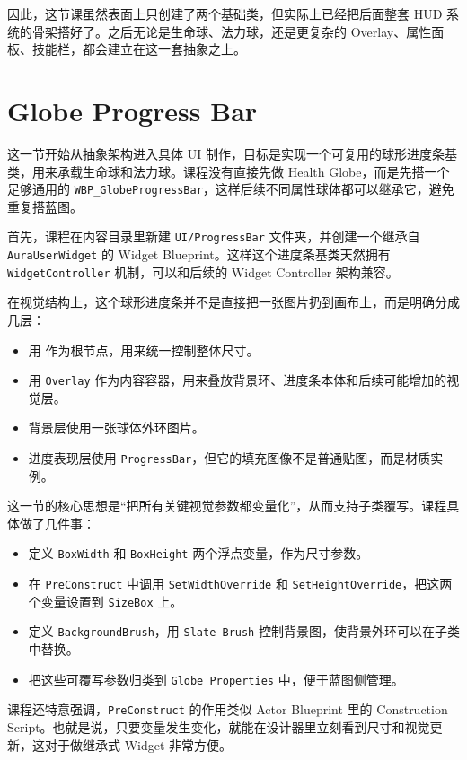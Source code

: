 因此，这节课虽然表面上只创建了两个基础类，但实际上已经把后面整套 HUD 系统的骨架搭好了。之后无论是生命球、法力球，还是更复杂的 Overlay、属性面板、技能栏，都会建立在这一套抽象之上。

\section{Globe Progress Bar}

这一节开始从抽象架构进入具体 UI 制作，目标是实现一个可复用的球形进度条基类，用来承载生命球和法力球。课程没有直接先做 Health Globe，而是先搭一个足够通用的 \texttt{WBP\_GlobeProgressBar}，这样后续不同属性球体都可以继承它，避免重复搭蓝图。

首先，课程在内容目录里新建 \texttt{UI/ProgressBar} 文件夹，并创建一个继承自 \texttt{AuraUserWidget} 的 Widget Blueprint。这样这个进度条基类天然拥有 \texttt{WidgetController} 机制，可以和后续的 Widget Controller 架构兼容。

在视觉结构上，这个球形进度条并不是直接把一张图片扔到画布上，而是明确分成几层：
\begin{itemize}
	\item 用  作为根节点，用来统一控制整体尺寸。
	\item 用 \texttt{Overlay} 作为内容容器，用来叠放背景环、进度条本体和后续可能增加的视觉层。
	\item 背景层使用一张球体外环图片。
	\item 进度表现层使用 \texttt{ProgressBar}，但它的填充图像不是普通贴图，而是材质实例。
\end{itemize}

这一节的核心思想是“把所有关键视觉参数都变量化”，从而支持子类覆写。课程具体做了几件事：
\begin{itemize}
	\item 定义 \texttt{BoxWidth} 和 \texttt{BoxHeight} 两个浮点变量，作为尺寸参数。
	\item 在 \texttt{PreConstruct} 中调用 \texttt{SetWidthOverride} 和 \texttt{SetHeightOverride}，把这两个变量设置到 \texttt{SizeBox} 上。
	\item 定义 \texttt{BackgroundBrush}，用 \texttt{Slate Brush} 控制背景图，使背景外环可以在子类中替换。
	\item 把这些可覆写参数归类到 \texttt{Globe Properties} 中，便于蓝图侧管理。
\end{itemize}

课程还特意强调，\texttt{PreConstruct} 的作用类似 Actor Blueprint 里的 Construction Script。也就是说，只要变量发生变化，就能在设计器里立刻看到尺寸和视觉更新，这对于做继承式 Widget 非常方便。

